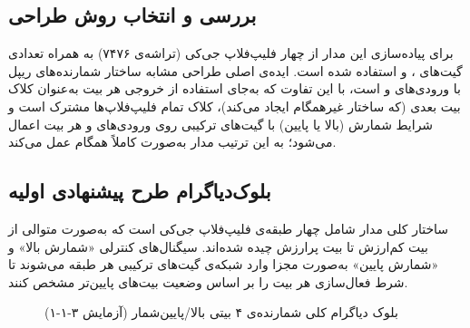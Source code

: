 \documentclass[12pt,a4paper]{article}
\begin{document}
\subsection{بررسی و انتخاب روش طراحی}
برای پیاده‌سازی این مدار از چهار فلیپ‌فلاپ جی‌کی (تراشه‌ی ۷۴۷۶) به همراه تعدادی گیت‌های ،  و  استفاده شده است. ایده‌ی اصلی طراحی مشابه ساختار شمارنده‌های ریپل با ورودی‌های  و  است، با این تفاوت که به‌جای استفاده از خروجی هر بیت به‌عنوان کلاک بیت بعدی (که ساختار غیرهمگام ایجاد می‌کند)، کلاک تمام فلیپ‌فلاپ‌ها مشترک است و شرایط شمارش (بالا یا پایین) با گیت‌های ترکیبی روی ورودی‌های  و  هر بیت اعمال می‌شود؛ به این ترتیب مدار به‌صورت کاملاً همگام  عمل می‌کند.

\subsection{بلوک‌دیاگرام طرح پیشنهادی اولیه}
ساختار کلی مدار شامل چهار طبقه‌ی فلیپ‌فلاپ جی‌کی است که به‌صورت متوالی از بیت کم‌ارزش  تا بیت پرارزش  چیده شده‌اند. سیگنال‌های کنترلی «شمارش بالا» و «شمارش پایین» به‌صورت مجزا وارد شبکه‌ی گیت‌های ترکیبی هر طبقه می‌شوند تا شرط فعال‌سازی  هر بیت را بر اساس وضعیت بیت‌های پایین‌تر مشخص کنند.

\begin{figure}[H]
	\centering
	\caption{بلوک دیاگرام کلی شمارنده‌ی ۴ بیتی بالا/پایین‌شمار (آزمایش ۳-۱-۱)}
\end{figure}
\end{document}
